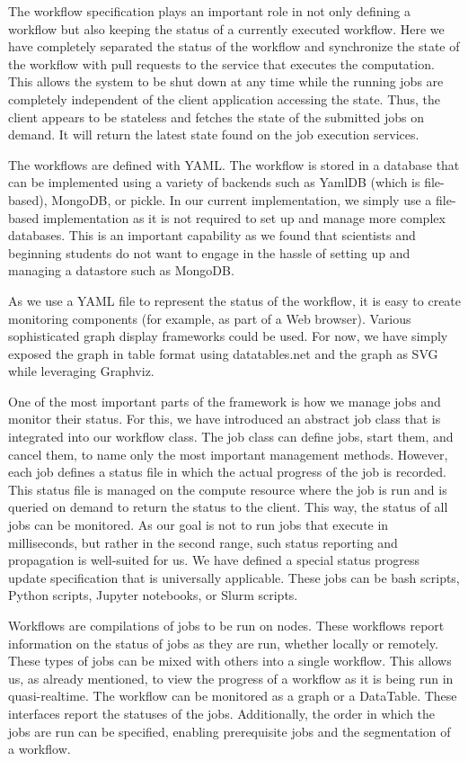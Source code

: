 The workflow specification plays an important role in not only defining
a workflow but also keeping the status of a currently executed
workflow. Here we have completely separated the status of the workflow
and synchronize the state of the workflow with pull requests to the
service that executes the computation. This allows the system to be
shut down at any time while the running jobs are completely
independent of the client application accessing the state. Thus, the
client appears to be stateless and fetches the state of the submitted
jobs on demand. It will return the latest state found on the job
execution services.

The workflows are defined with YAML. The workflow is stored in a
database that can be implemented using a variety of backends such as
YamlDB (which is file-based), MongoDB, or pickle. In our current
implementation, we simply use a file-based implementation as it is not
required to set up and manage more complex databases. This is an
important capability as we found that scientists and beginning
students do not want to engage in the hassle of setting up and
managing a datastore such as MongoDB.

As we use a YAML file to represent the status of the workflow, it is
easy to create monitoring components (for example, as part of a Web
browser). Various sophisticated graph display frameworks could be
used. For now, we have simply exposed the graph in table format using
datatables.net and the graph as SVG while leveraging Graphviz.

One of the most important parts of the framework is how we manage jobs
and monitor their status. For this, we have introduced an abstract job
class that is integrated into our workflow class. The job class can define jobs, start them, and cancel them, to name only the
most important management methods. However, each job defines a status
file in which the actual progress of the job is recorded. This status
file is managed on the compute resource where the job is run and is
queried on demand to return the status to the client. This way, the
status of all jobs can be monitored. As our goal is not to run jobs
that execute in milliseconds, but rather in the second range, such
status reporting and propagation is well-suited for us. We have
defined a special status progress update specification that is
universally applicable. These jobs can be bash scripts, Python scripts,
Jupyter notebooks, or Slurm scripts.

Workflows are compilations of jobs to be run on nodes. These workflows
report information on the status of jobs as they are run, whether
locally or remotely. These types of jobs can be mixed
with others into a single workflow. This allows us, as already mentioned, 
to view the progress of a workflow as it is being run in quasi-realtime.
The workflow can be monitored as a graph or a DataTable. These interfaces
report the statuses of the jobs. Additionally, the order in which the jobs
are run can be specified, enabling prerequisite jobs and the segmentation of a
workflow.

